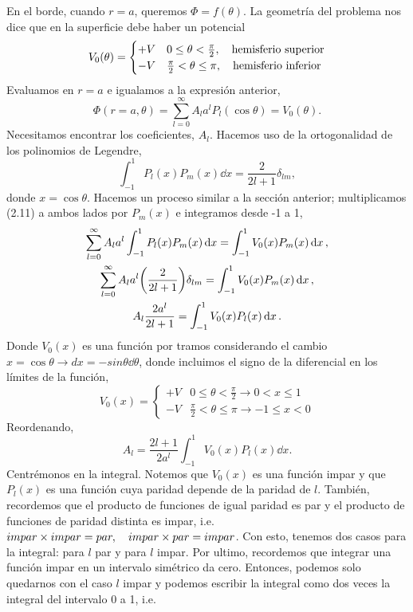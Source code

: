 \documentclass[11pt]{article}
\theoremstyle{definition}
\numberwithin{equation}{section}
\begin{document}
En el borde, cuando $r=a$, queremos $\Phi = f(\theta)$. La geometría del problema nos dice que en la superficie debe haber un potencial
\begin{equation}
    V_0(\theta) = \begin{cases}
        +V & 0\leq \theta < \frac{\pi}{2} \qc \text{hemisferio superior} \\ 
        -V & \frac{\pi}{2} < \theta \leq \pi \qc \text{hemisferio inferior}
    \end{cases}
\end{equation}
Evaluamos en $r=a$ e igualamos a la expresión anterior,
\begin{equation}
    \Phi(r=a,\theta) = \sum_{l=0}^{\infty}A_l a^lP_l(\cos\theta) = V_0(\theta).
\end{equation}
Necesitamos encontrar los coeficientes, $A_l$. Hacemos uso de la ortogonalidad de los polinomios de Legendre,
\begin{equation}
    \int_{-1}^{1}P_l(x)P_m(x)\dd{x} = \frac{2}{2l+1}\delta_{lm},
\end{equation}
donde $x=\cos\theta$. Hacemos un proceso similar a la sección anterior; multiplicamos (2.11) a ambos lados por $P_m(x)$ e integramos desde -1 a 1,
\begin{gather}
    \sum_{l=0}^{\infty}A_l a^l\int_{-1}^{1}P_l(x)P_m(x)\dd{x} = \int_{-1}^{1} V_0(x)P_m(x)\dd{x}, \\
    \sum_{l=0}^{\infty}A_l a^l\pqty{\frac{2}{2l+1}}\delta_{lm} = \int_{-1}^{1} V_0(x)P_m(x)\dd{x}, \\
    A_l \frac{2a^l}{2l+1} = \int_{-1}^{1} V_0(x)P_l(x)\dd{x}.
\end{gather}
Donde $V_0(x)$ es una función por tramos considerando el cambio $x = \cos\theta \to dx = -sin\theta\dd{\theta}$, donde incluimos el signo de la diferencial en los límites de la función,
\begin{equation}
    V_0(x) = \begin{cases}
        +V & 0\leq \theta < \frac{\pi}{2} \to 0 < x \leq 1\\ 
        -V & \frac{\pi}{2} < \theta \leq \pi \to -1 \leq x < 0
    \end{cases}
\end{equation}
Reordenando,
\begin{equation}
    A_l = \frac{2l+1}{2a^l}\int_{-1}^{1} V_0(x)P_l(x)\dd{x}.
\end{equation}
Centrémonos en la integral. Notemos que $V_0(x)$ es una función impar y que $P_l(x)$ es una función cuya paridad depende de la paridad de $l$. También, recordemos que el producto de funciones de igual paridad es par y el producto de funciones de paridad distinta es impar, i.e. $impar\times impar = par \qc impar \times par = impar$. Con esto, tenemos dos casos para la integral: para $l$ par y para $l$ impar. Por ultimo, recordemos que integrar una función impar en un intervalo simétrico da cero. Entonces, podemos solo quedarnos con el caso $l$ impar y podemos escribir la integral como dos veces la integral del intervalo 0 a 1, i.e.
\end{document}
